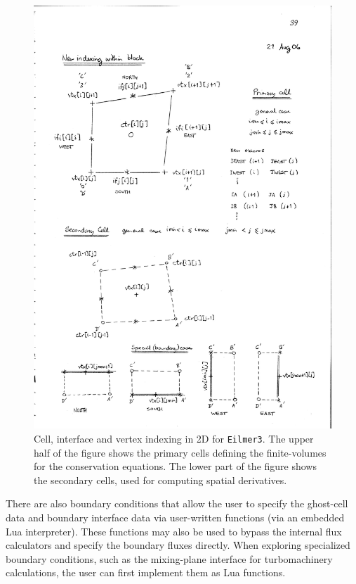 \begin{figure}
   \centerline{ \includegraphics[width=120mm,viewport=28 16 396 515,clip=true]{figures/mbcns2-cell-and-interface-indexing.pdf} }
   \caption{Cell, interface and vertex indexing in 2D for \texttt{Eilmer3}.  The upper half of the figure
       shows the primary cells defining the finite-volumes for the conservation equations.
       The lower part of the figure shows the secondary cells, used for computing spatial derivatives.}
   \label{mbcns2-cell-fig}
\end{figure}

\medskip
There are also boundary conditions that allow the user to specify the ghost-cell data and boundary
interface data via user-written functions (via an embedded Lua interpreter).
These functions may also be used to bypass the internal flux calculators and specify the boundary
fluxes directly.
When exploring specialized boundary conditions, 
such as the mixing-plane interface for turbomachinery calculations,
the user can first implement them as Lua functions.



